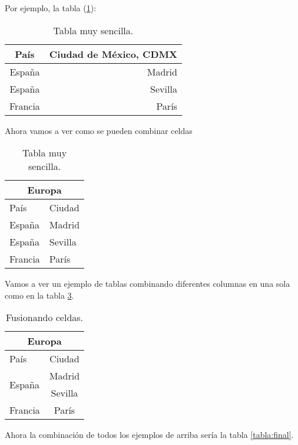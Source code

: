 \documentclass[a4paper,openright,10pt]{report}
\begin{document}
Por ejemplo, la tabla (\ref{tabla:sencilla}):

\begin{table}[htbp]
	\begin{center}
		\begin{tabular}{|c|r|}
			\hline
			País	& Ciudad de México, CDMX\\
			\hline
			España	& Madrid \\ \hline
			España	& Sevilla \\ \hline
			Francia	& París \\ \hline
		\end{tabular}
		\caption{Tabla muy sencilla.}
	\label{tabla:sencilla}
	\end{center}
\end{table}


Ahora vamos a ver como se pueden combinar celdas
\begin{table}[htb]
	\centering
	\begin{tabular}{| p{3.2cm}| p{2.2cm} |}
		\hline
		\multicolumn{2}{|c|}{Europa} \\ \hline
		País & Ciudad \\
		\hline \hline	
		España & Madrid \\ \hline
		España & Sevilla  \\ \hline
		Francia & París \\ \hline
	\end{tabular}
	\caption{Tabla muy sencilla.}
	\label{tabla:sencilla2}
\end{table}


Vamos a ver un ejemplo de tablas combinando diferentes columnas en una sola como en la tabla \ref{tabla:fusionandoceldas}. \cite{1}

\begin{table}[htb]
	\centering
	\begin{tabular}{|l|c|}
		\hline
		\multicolumn{2}{|c|}{Europa} \\
		\hline
		País & Ciudad \\
		\hline \hline
		\multirow{2}{1cm}{España} & Madrid \\ \cline{2-2}
		& Sevilla \\ \hline
		Francia & París \\ \hline
	\end{tabular}
	\caption{Fusionando celdas.}
	\label{tabla:fusionandoceldas}
\end{table}

Ahora la combinación de todos los ejemplos de arriba sería la tabla \ref{tabla:final}.
\end{document}
